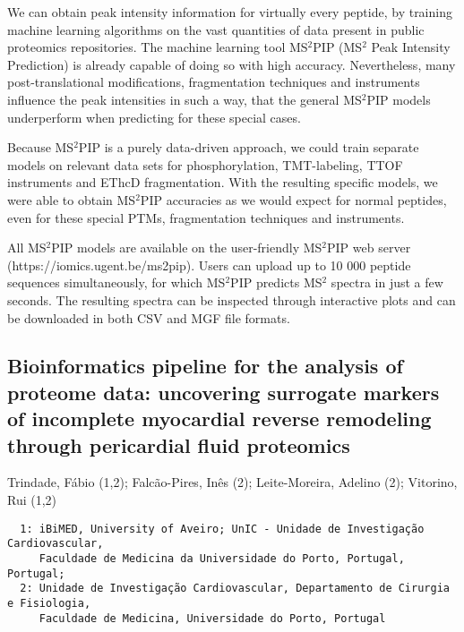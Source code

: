 {We can obtain peak intensity information for virtually every peptide, by training machine learning algorithms on the vast quantities of data present in public proteomics repositories. The machine learning tool MS$^2$PIP (MS$^2$ Peak Intensity Prediction) is already capable of doing so with high accuracy. Nevertheless, many post-translational modifications, fragmentation techniques and instruments influence the peak intensities in such a way, that the general MS$^2$PIP models underperform when predicting for these special cases.

Because MS$^2$PIP is a purely data-driven approach, we could train separate models on relevant data sets for phosphorylation, TMT-labeling, TTOF instruments and EThcD fragmentation. With the resulting specific models, we were able to obtain MS$^2$PIP accuracies as we would expect for normal peptides, even for these special PTMs, fragmentation techniques and instruments.

All MS$^2$PIP models are available on the user-friendly MS$^2$PIP web server (https://iomics.ugent.be/ms2pip). Users can upload up to 10 000 peptide sequences simultaneously, for which MS$^2$PIP predicts MS$^2$ spectra in just a few seconds. The resulting spectra can be inspected through interactive plots and can be downloaded in both CSV and MGF file formats.


\subsection*{\color{eubicRed} Bioinformatics pipeline for the analysis of proteome data: uncovering surrogate markers of incomplete myocardial reverse remodeling through pericardial fluid proteomics}
{\color{eubicGray}Trindade, Fábio (1,2);
Falcão-Pires, Inês (2);
Leite-Moreira, Adelino (2);
Vitorino, Rui (1,2)}
{\color{eubicGray}\begin{verbatim}
  1: iBiMED, University of Aveiro; UnIC - Unidade de Investigação Cardiovascular,
     Faculdade de Medicina da Universidade do Porto, Portugal, Portugal;
  2: Unidade de Investigação Cardiovascular, Departamento de Cirurgia e Fisiologia,
     Faculdade de Medicina, Universidade do Porto, Portugal
\end{verbatim}}

}
